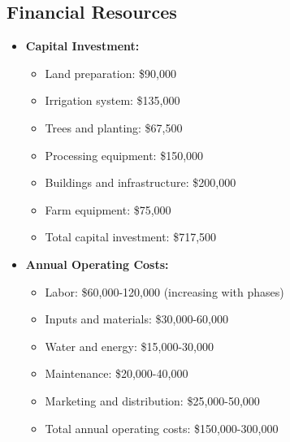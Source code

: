 \subsection{Financial Resources}
\begin{itemize}
    \item \textbf{Capital Investment:}
    \begin{itemize}
        \item Land preparation: \$90,000
        \item Irrigation system: \$135,000
        \item Trees and planting: \$67,500
        \item Processing equipment: \$150,000
        \item Buildings and infrastructure: \$200,000
        \item Farm equipment: \$75,000
        \item Total capital investment: \$717,500
    \end{itemize}
    \item \textbf{Annual Operating Costs:}
    \begin{itemize}
        \item Labor: \$60,000-120,000 (increasing with phases)
        \item Inputs and materials: \$30,000-60,000
        \item Water and energy: \$15,000-30,000
        \item Maintenance: \$20,000-40,000
        \item Marketing and distribution: \$25,000-50,000
        \item Total annual operating costs: \$150,000-300,000
    \end{itemize}
\end{itemize}

